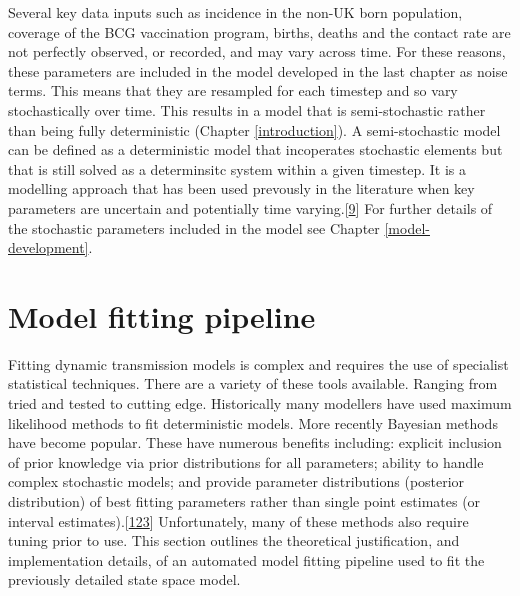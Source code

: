 \documentclass[11pt,twoside]{bristolthesis}
\begin{document}
  Several key data inputs such as incidence in the non-UK born population, coverage of the BCG vaccination program, births, deaths and the contact rate are not perfectly observed, or recorded, and may vary across time. For these reasons, these parameters are included in the model developed in the last chapter as noise terms. This means that they are resampled for each timestep and so vary stochastically over time. This results in a model that is semi-stochastic rather than being fully deterministic (Chapter \ref{introduction}). A semi-stochastic model can be defined as a deterministic model that incoperates stochastic elements but that is still solved as a determinsitc system within a given timestep. It is a modelling approach that has been used prevously in the literature when key parameters are uncertain and potentially time varying.{[}\protect\hyperlink{ref-Funk2016a}{9}{]} For further details of the stochastic parameters included in the model see Chapter \ref{model-development}.
  
  \hypertarget{fitting-pipeline}{%
  \section{Model fitting pipeline}\label{fitting-pipeline}}
  
  Fitting dynamic transmission models is complex and requires the use of specialist statistical techniques. There are a variety of these tools available. Ranging from tried and tested to cutting edge. Historically many modellers have used maximum likelihood methods to fit deterministic models. More recently Bayesian methods have become popular. These have numerous benefits including: explicit inclusion of prior knowledge via prior distributions for all parameters; ability to handle complex stochastic models; and provide parameter distributions (posterior distribution) of best fitting parameters rather than single point estimates (or interval estimates).{[}\protect\hyperlink{ref-Murray2015}{123}{]} Unfortunately, many of these methods also require tuning prior to use. This section outlines the theoretical justification, and implementation details, of an automated model fitting pipeline used to fit the previously detailed state space model.
  
\end{document}

